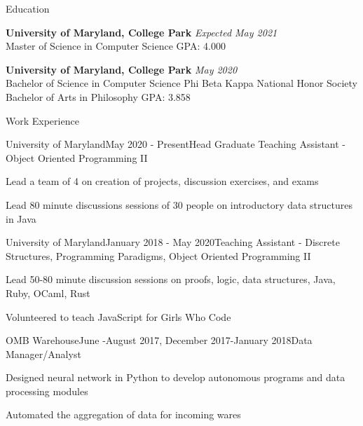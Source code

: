 \documentclass{resume} %
\begin{document}

\begin{rSection}{Education}

{\bf University of Maryland, College Park} \hfill {\em Expected May 2021} \\ 
Master of Science in  Computer Science \hfill {GPA: 4.000}

{\bf University of Maryland, College Park} \hfill {\em May 2020} \\ 
Bachelor of Science in  Computer Science \hfill {Phi Beta Kappa National Honor Society}\\
Bachelor of Arts in Philosophy \hfill {GPA: 3.858}

\end{rSection}


\begin{rSection}{Work Experience}

\begin{rSubsection}{University of Maryland}{May 2020 - Present}{Head Graduate Teaching Assistant - Object Oriented Programming II}{}
\item Lead a team of 4 on creation of projects, discussion exercises, and exams 
\item Lead 80 minute discussions sessions of 30 people on introductory data structures in Java
\end{rSubsection}

\begin{rSubsection}{University of Maryland}{January 2018 - May 2020}{Teaching Assistant - Discrete Structures, Programming Paradigms, Object Oriented Programming II}{}
\item Lead 50-80 minute discussion sessions on proofs, logic, data structures, Java, Ruby, OCaml, Rust
\item Volunteered to teach JavaScript for Girls Who Code
\end{rSubsection}

\begin{rSubsection}{OMB Warehouse}{June -August 2017, December 2017-January 2018}{Data Manager/Analyst}{}
\item Designed neural network in Python to develop autonomous programs and data processing modules
\item Automated the aggregation of data for incoming wares
\end{rSubsection}

\end{rSection}
\end{document}
